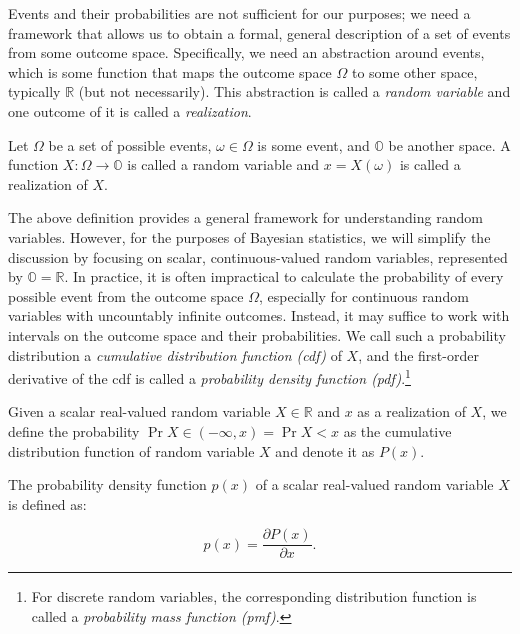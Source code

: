 Events and their probabilities are not sufficient for our purposes;
we need a framework that allows us to obtain a formal, general description of a set
of events from some outcome space. Specifically, we need an abstraction around events,
which is some function that maps the outcome space $\Omega$ to some other space,
typically $\mathbb{R}$ (but not necessarily). This abstraction is called a
\textit{random variable} and one outcome of it is called a \textit{realization}.

\begin{definition}
    Let $\Omega$ be a set of possible events, $\omega \in \Omega$ is some event,
    and $\mathbb{O}$ be another space. A function $X: \Omega \rightarrow \mathbb{O}$
    is called a random variable and $x = X(\omega)$ is called a realization of $X$.
\end{definition}

The above definition provides a general framework for understanding random variables.
However, for the purposes of Bayesian statistics, we will simplify the discussion by
focusing on scalar, continuous-valued random variables, represented
by $\mathbb{O} = \mathbb{R}$. In practice, it is often impractical to calculate the
probability of every possible event from the outcome space $\Omega$, especially for
continuous random variables with uncountably infinite outcomes. Instead, it may suffice
to work with intervals on the outcome space and their probabilities. We call such a
probability distribution a \textit{cumulative distribution function (cdf)} of $X$,
and the first-order derivative of the cdf is called a \textit{probability density
function (pdf)}.\footnote{
    For discrete random variables, the corresponding distribution function is
    called a \textit{probability mass function (pmf)}.
}

\begin{definition}
    Given a scalar real-valued random variable $X \in \mathbb{R}$ and $x$ as a
    realization of $X$, we define the probability $\Pr{X \in (-\infty, x)} = \Pr{X < x}$
    as the cumulative distribution function of random variable $X$ and denote it as $P(x)$.
\end{definition}

\begin{definition}
    The probability density function $p(x)$ of a scalar real-valued random variable $X$
    is defined as:

    \begin{equation}
        p(x) = \frac{\partial P(x)}{\partial x}.
    \end{equation}
\end{definition}

